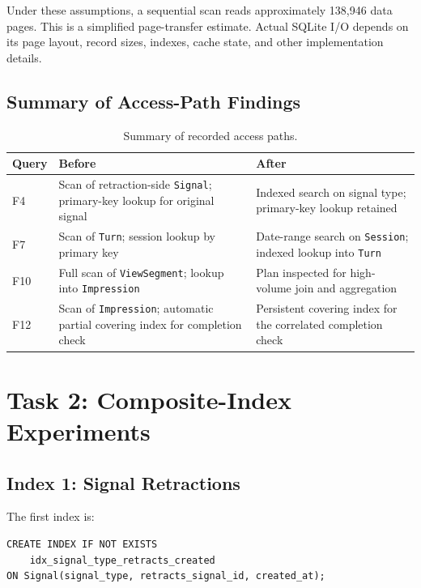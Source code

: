 \documentclass[11pt,a4paper]{article}
\begin{document}
Under these assumptions, a sequential scan reads approximately
138,946 data pages. This is a simplified page-transfer estimate.
Actual SQLite I/O depends on its page layout, record sizes, indexes,
cache state, and other implementation details.

\subsection{Summary of Access-Path Findings}

\begin{table}[H]
\centering
\small
\begin{tabular}{p{1.1cm}p{5.0cm}p{5.0cm}}
\toprule
\textbf{Query} & \textbf{Before} & \textbf{After} \\
\midrule
F4 &
Scan of retraction-side \texttt{Signal}; primary-key lookup for
original signal &
Indexed search on signal type; primary-key lookup retained \\

F7 &
Scan of \texttt{Turn}; session lookup by primary key &
Date-range search on \texttt{Session}; indexed lookup into
\texttt{Turn} \\

F10 &
Full scan of \texttt{ViewSegment}; lookup into \texttt{Impression} &
Plan inspected for high-volume join and aggregation \\

F12 &
Scan of \texttt{Impression}; automatic partial covering index for
completion check &
Persistent covering index for the correlated completion check \\
\bottomrule
\end{tabular}
\caption{Summary of recorded access paths.}
\end{table}

\section{Task 2: Composite-Index Experiments}

\subsection{Index 1: Signal Retractions}

The first index is:

\begin{lstlisting}[style=sqlstyle]
CREATE INDEX IF NOT EXISTS
    idx_signal_type_retracts_created
ON Signal(signal_type, retracts_signal_id, created_at);
\end{lstlisting}
\end{document}
